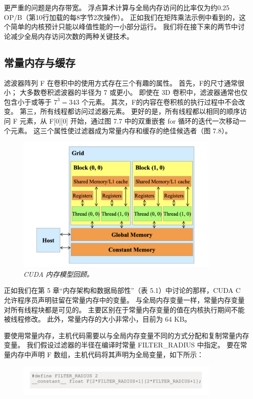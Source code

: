 更严重的问题是内存带宽。 浮点算术计算与全局内存访问的比率仅为约0.25 OP/B（第10行加载的每8字节2次操作）。 
正如我们在矩阵乘法示例中看到的，这个简单的内核预计只能以峰值性能的一小部分运行。 
我们将在接下来的两节中讨论减少全局内存访问次数的两种关键技术。

\subsection{常量内存与缓存}
滤波器阵列 F 在卷积中的使用方式存在三个有趣的属性。 首先，F的尺寸通常很小； 大多数卷积滤波器的半径为 7 或更小。 
即使在 3D 卷积中，滤波器通常也仅包含小于或等于 $7^3 = 343$ 个元素。 其次，F的内容在卷积核的执行过程中不会改变。 
第三，所有线程都访问过滤器元素。 
更好的是，所有线程都以相同的顺序访问 F 元素，从 F[0][0] 开始，通过图 7.7 中的双重嵌套 for 循环的迭代一次移动一个元素。 
这三个属性使过滤器成为常量内存和缓存的绝佳候选者（图 7.8）。

\begin{figure}[H]
	\centering
	\includegraphics[width=0.9\textwidth]{figs/F7.8.png}
	\caption{\textit{CUDA 内存模型回顾。}}
\end{figure}

正如我们在第 5 章“内存架构和数据局部性”（表 5.1）中讨论的那样，CUDA C 允许程序员声明驻留在常量内存中的变量。 
与全局内存变量一样，常量内存变量对所有线程块都是可见的。 主要区别在于常量内存变量的值在内核执行期间不能被线程修改。 
此外，常量内存的大小非常小，目前为 64 KB。

要使用常量内存，主机代码需要以与全局内存变量不同的方式分配和复制常量内存变量。 
我们假设过滤器的半径在编译时常量 FILTER\_RADIUS 中指定。 
要在常量内存中声明 F 数组，主机代码将其声明为全局变量，如下所示：

\begin{figure}[H]
	\centering
	\includegraphics[width=0.9\textwidth]{figs/F7-a3.png}
\end{figure}

